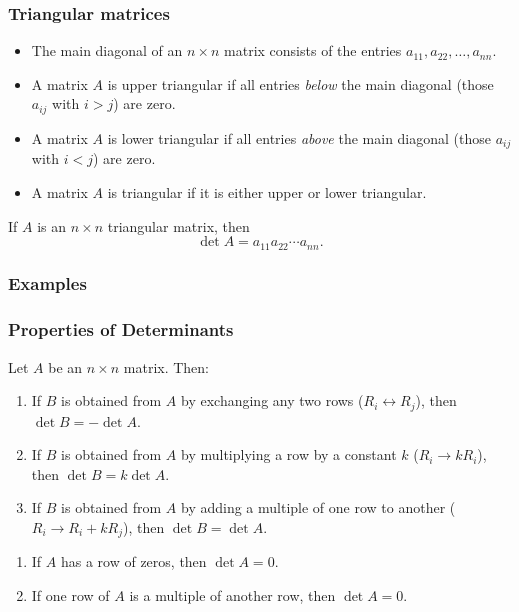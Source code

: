 \documentclass[11pt,t]{beamer}
\begin{document}
\begin{frame}
 \frametitle{Triangular matrices}
\begin{itemize}
 \item The \alert{main diagonal} of an $n\times n$ matrix consists of the entries $a_{11},a_{22},\ldots, a_{nn}$.
 \item A matrix $A$ is \alert{upper triangular} if all entries {\em below} the main diagonal (those $a_{ij}$ with $i>j$) are zero.
 \item A matrix $A$ is \alert{lower triangular} if all entries {\em above} the main diagonal (those $a_{ij}$ with $i<j$) are zero.
 \item A matrix $A$ is \alert{triangular} if it is either upper or lower triangular.
\end{itemize}
\begin{theorem}
 If $A$ is an $n\times n$ triangular matrix, then
\[
 \det A = a_{11}a_{22}\cdots a_{nn}.
\]
\end{theorem}
\end{frame}
\begin{frame}\frametitle{Examples}
 
\end{frame}
\begin{frame}\frametitle{Properties of Determinants}
 \begin{theorem}
  Let $A$ be an $n\times n$ matrix. Then:
\begin{enumerate}
 \item If $B$ is obtained from $A$ by exchanging any two rows ($R_i\leftrightarrow R_j$), then $\det B = -\det A$.
 \item If $B$ is obtained from $A$ by multiplying a row by a constant $k$ ($R_i\to kR_i$), then $\det B = k\det A$.
 \item If $B$ is obtained from $A$ by adding a multiple of one row to another ($R_i\to R_i+kR_j$), then $\det B = \det A$.
\end{enumerate}
 \end{theorem}
 \begin{corollary}
\begin{enumerate}
 \item If $A$ has a row of zeros, then  $\det A = 0$.
 \item If one row of $A$ is a multiple of another row, then $\det A = 0$.
\end{enumerate}
 \end{corollary}

\end{frame}
\end{document}
